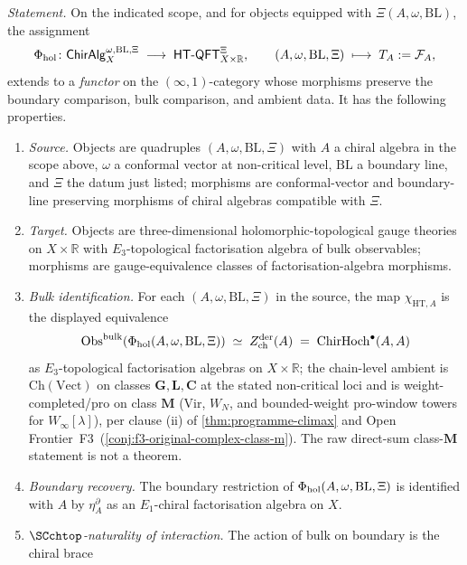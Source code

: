 \begin{theorem}
	\emph{Statement.} On the indicated scope, and for objects equipped
	with \(\Xi(A,\omega,\mathrm{BL})\), the assignment
	\[
	 \Phi_{\mathrm{hol}}\colon \mathsf{ChirAlg}^{\omega, \mathrm{BL},\Xi}_{X}
	 \;\longrightarrow\;
	 \mathsf{HT\text{-}QFT}^{\Xi}_{X \times \mathbb{R}},
	 \qquad
	 (A, \omega, \mathrm{BL},\Xi) \;\longmapsto\;
	 T_{A}:=\mathcal F_A,
	\]
	extends to a \emph{functor} on the \((\infty,1)\)-category whose
	morphisms preserve the boundary comparison, bulk comparison, and
	ambient data. It has the following properties.
\begin{enumerate}
	\item[(M1)] \emph{Source.} Objects are quadruples
	 \((A,\omega,\mathrm{BL},\Xi)\) with \(A\) a chiral algebra in the
	 scope above, \(\omega\) a conformal vector at non-critical level,
	 \(\mathrm{BL}\) a boundary line, and \(\Xi\) the datum just listed;
	 morphisms are conformal-vector and boundary-line preserving
	 morphisms of chiral algebras compatible with \(\Xi\).
\item[(M2)] \emph{Target.} Objects are three-dimensional
 holomorphic-topological gauge theories on $X \times \mathbb{R}$
 with $E_{3}$-topological factorisation algebra of bulk
 observables; morphisms are gauge-equivalence classes of
 factorisation-algebra morphisms.
	\item[(M3)]\label{M3} \emph{Bulk identification.} For each
	 \((A,\omega,\mathrm{BL},\Xi)\) in the source, the map
	 \(\chi_{\mathrm{HT},A}\) is the displayed equivalence
	 \[
	 \mathrm{Obs}^{\mathrm{bulk}}(\Phi_{\mathrm{hol}}(A,\omega,\mathrm{BL},\Xi))
	 \;\simeq\;
 Z^{\mathrm{der}}_{\mathrm{ch}}(A)
 \;=\;
 \mathrm{ChirHoch}^{\bullet}(A, A)
 \]
 as $E_{3}$-topological factorisation algebras on
 $X \times \mathbb{R}$; the chain-level ambient is
 $\mathrm{Ch}(\mathrm{Vect})$ on classes
 $\mathbf{G}, \mathbf{L}, \mathbf{C}$ at the stated non-critical
 loci and is weight-completed/pro on class $\mathbf{M}$ (Vir,
 $W_{N}$, and bounded-weight pro-window towers for
 $W_{\infty}[\lambda]$), per clause (ii) of
 \cref{thm:programme-climax} and Open
 Frontier~F3~(\cref{conj:f3-original-complex-class-m}). The raw
 direct-sum class-\(\mathbf M\) statement is not a theorem.
	\item[(M4)]\label{M4} \emph{Boundary recovery.} The boundary restriction of
	 \(\Phi_{\mathrm{hol}}(A,\omega,\mathrm{BL},\Xi)\) is identified with \(A\)
	 by \(\eta^\partial_A\) as an \(E_1\)-chiral factorisation algebra
	 on \(X\).
\item[(M5)] \emph{$\SCchtop$-naturality of interaction.} The action
 of bulk on boundary is the chiral brace

\end{enumerate}
\end{theorem}

